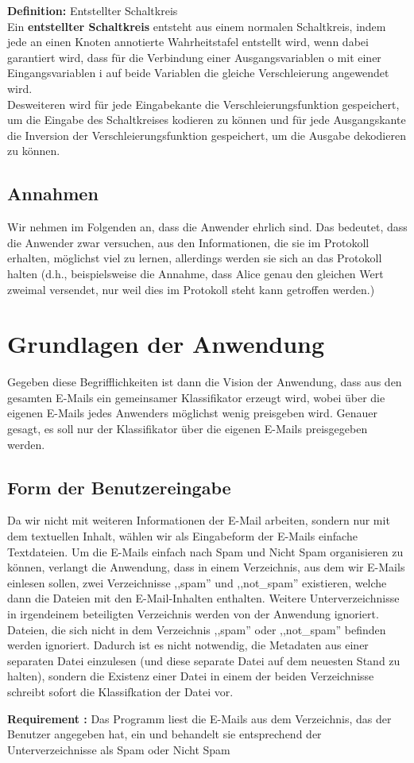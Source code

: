 \documentclass{article}
\newenvironment{definition}
    [1]
    {
        {\bf Definition:} #1\\
    }
    {}
\newcommand{\defined}
    [1]
    {
        {\bf #1}
    }
\newcounter{requirementscount}{}
\newcommand{\requirement}[1] {
        \addtocounter{requirementscount}{1}
        {\bf Requirement \therequirementscount:} #1\\
    }
\begin{document}
\begin{definition}{Entstellter Schaltkreis}
Ein \defined{entstellter Schaltkreis} entsteht aus einem normalen Schaltkreis,
 indem jede an einen Knoten annotierte Wahrheitstafel entstellt wird, wenn
 dabei garantiert wird, dass f\"ur die Verbindung einer Ausgangsvariablen
 o mit einer Eingangsvariablen i auf beide Variablen die gleiche
 Verschleierung angewendet wird.\\
Desweiteren wird f\"ur jede Eingabekante die Verschleierungsfunktion
 gespeichert, um die Eingabe des Schaltkreises kodieren zu k\"onnen und
 f\"ur jede Ausgangskante die Inversion der Verschleierungsfunktion
 gespeichert, um die Ausgabe dekodieren zu k\"onnen.
\end{definition}
\subsection{Annahmen}
Wir nehmen im Folgenden an, dass die Anwender ehrlich sind.
Das bedeutet, dass die Anwender zwar versuchen, aus den Informationen,
die sie im Protokoll erhalten, m\"oglichst viel zu lernen, allerdings
werden sie sich an das Protokoll halten (d.h., beispielsweise
die Annahme, dass Alice genau den gleichen Wert zweimal versendet,
nur weil dies im Protokoll steht kann getroffen werden.)

\pagebreak
\section{Grundlagen der Anwendung}
Gegeben diese Begrifflichkeiten ist dann die Vision der Anwendung, dass
aus den gesamten E-Mails ein gemeinsamer Klassifikator erzeugt wird,
wobei \"uber die eigenen E-Mails jedes Anwenders m\"oglichst wenig preisgeben
wird. Genauer gesagt, es soll nur der Klassifikator \"uber die eigenen 
E-Mails preisgegeben werden.

\subsection{Form der Benutzereingabe}
Da wir nicht mit weiteren Informationen der E-Mail arbeiten, sondern nur mit
dem textuellen Inhalt, w\"ahlen wir als Eingabeform der E-Mails einfache
Textdateien. Um die E-Mails einfach nach Spam und Nicht Spam organisieren
zu k\"onnen, verlangt die Anwendung, dass in einem Verzeichnis, aus
dem wir E-Mails einlesen sollen, zwei  Verzeichnisse ,,spam'' und ,,not\_spam'' 
existieren, welche dann die Dateien mit den E-Mail-Inhalten enthalten.
Weitere Unterverzeichnisse in irgendeinem beteiligten Verzeichnis werden
von der Anwendung ignoriert. Dateien, die sich nicht in dem Verzeichnis
,,spam'' oder ,,not\_spam'' befinden werden ignoriert.
Dadurch ist es nicht notwendig, die Metadaten aus einer separaten Datei 
einzulesen (und diese separate Datei auf dem neuesten Stand zu halten),
sondern die Existenz einer Datei in einem der beiden Verzeichnisse schreibt
sofort die Klassifkation der Datei vor.\\
\requirement{Das Programm liest die E-Mails aus dem Verzeichnis, das der
Benutzer angegeben hat, ein und behandelt sie entsprechend der
Unterverzeichnisse als Spam oder Nicht Spam}
\end{document}
